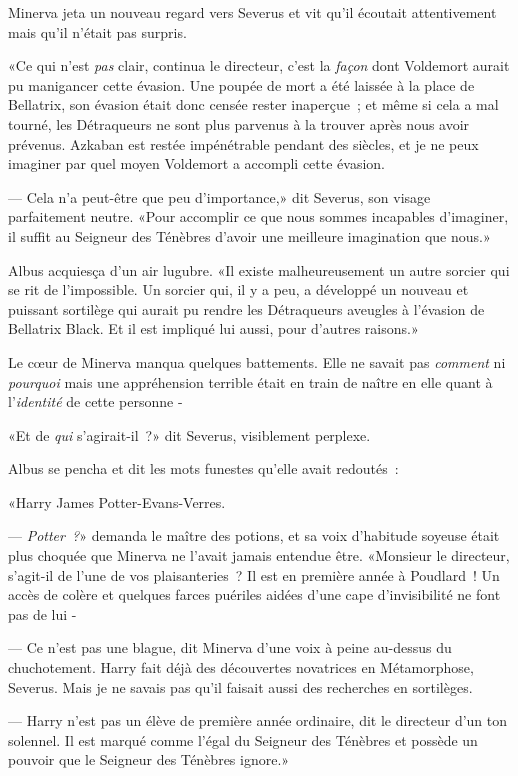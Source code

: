 Minerva jeta un nouveau regard vers Severus et vit qu'il écoutait attentivement mais qu'il n'était pas surpris.

«Ce qui n'est \emph{pas} clair, continua le directeur, c'est la \emph{façon} dont Voldemort aurait pu manigancer cette évasion. Une poupée de mort a été laissée à la place de Bellatrix, son évasion était donc censée rester inaperçue~; et même si cela a mal tourné, les Détraqueurs ne sont plus parvenus à la trouver après nous avoir prévenus. Azkaban est restée impénétrable pendant des siècles, et je ne peux imaginer par quel moyen Voldemort a accompli cette évasion.

--- Cela n'a peut-être que peu d'importance,» dit Severus, son visage parfaitement neutre. «Pour accomplir ce que nous sommes incapables d'imaginer, il suffit au Seigneur des Ténèbres d'avoir une meilleure imagination que nous.»

Albus acquiesça d'un air lugubre. «Il existe malheureusement un autre sorcier qui se rit de l'impossible. Un sorcier qui, il y a peu, a développé un nouveau et puissant sortilège qui aurait pu rendre les Détraqueurs aveugles à l'évasion de Bellatrix Black. Et il est impliqué lui aussi, pour d'autres raisons.»

Le cœur de Minerva manqua quelques battements. Elle ne savait pas \emph{comment} ni \emph{pourquoi} mais une appréhension terrible était en train de naître en elle quant à l'\emph{identité} de cette personne -

«Et de \emph{qui} s'agirait-il~?» dit Severus, visiblement perplexe.

Albus se pencha et dit les mots funestes qu'elle avait redoutés~:

«Harry James Potter-Evans-Verres.

--- \emph{Potter~?}» demanda le maître des potions, et sa voix d'habitude soyeuse était plus choquée que Minerva ne l'avait jamais entendue être. «Monsieur le directeur, s'agit-il de l'une de vos plaisanteries~? Il est en première année à Poudlard~! Un accès de colère et quelques farces puériles aidées d'une cape d'invisibilité ne font pas de lui -

--- Ce n'est pas une blague, dit Minerva d'une voix à peine au-dessus du chuchotement. Harry fait déjà des découvertes novatrices en Métamorphose, Severus. Mais je ne savais pas qu'il faisait aussi des recherches en sortilèges.

--- Harry n'est pas un élève de première année ordinaire, dit le directeur d'un ton solennel. Il est marqué comme l'égal du Seigneur des Ténèbres et possède un pouvoir que le Seigneur des Ténèbres ignore.»


